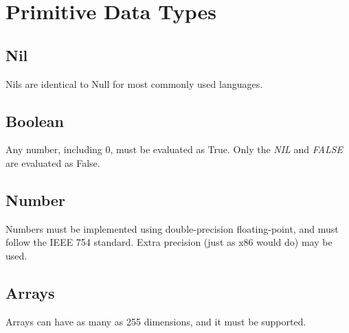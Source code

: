 \section{Primitive Data Types}

\subsection{Nil}
Nils are identical to Null for most commonly used languages.

\subsection{Boolean}
Any number, including 0, must be evaluated as True. Only the \emph{NIL} and \emph{FALSE} are evaluated as False.

\subsection{Number}
Numbers must be implemented using double-precision floating-point, and must follow the IEEE 754 standard. Extra precision (just as x86 would do) may be used.

\subsection{Arrays}
Arrays can have as many as 255 dimensions, and it must be supported.
